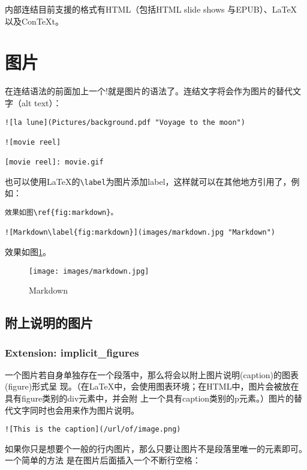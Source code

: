 \documentclass[fancyhdr,bookmark]{ctexbook}
\begin{document}
内部连结目前支援的格式有HTML（包括HTML slide shows 与EPUB）、LaTeX
以及ConTeXt。

\section{图片}\label{ux56feux7247}

在连结语法的前面加上一个!就是图片的语法了。连结文字将会作为图片的替代文字（alt
text）：

\begin{lstlisting}
![la lune](Pictures/background.pdf "Voyage to the moon")

![movie reel]

[movie reel]: movie.gif
\end{lstlisting}

也可以使用LaTeX的\lstinline!\label!为图片添加label，这样就可以在其他地方引用了，例如：

\begin{lstlisting}
效果如图\ref{fig:markdown}。

![Markdown\label{fig:markdown}](images/markdown.jpg "Markdown")
\end{lstlisting}

效果如图\ref{fig:markdown}。

\begin{figure}
\centering
\texttt{[image: images/markdown.jpg]}
\caption{Markdown\label{fig:markdown}}
\end{figure}

\subsection{附上说明的图片}\label{ux9644ux4e0aux8bf4ux660eux7684ux56feux7247}

\subsubsection{Extension:
implicit\_figures}\label{extension-implicit_figures}

一个图片若自身单独存在一个段落中，那么将会以附上图片说明(caption)的图表(figure)形式呈
现。（在LaTeX中，会使用图表环境；在HTML中，图片会被放在具有figure类别的div元素中，并会附
上一个具有caption类别的p元素。）图片的替代文字同时也会用来作为图片说明。

\begin{lstlisting}
![This is the caption](/url/of/image.png)
\end{lstlisting}

如果你只是想要个一般的行内图片，那么只要让图片不是段落里唯一的元素即可。一个简单的方法
是在图片后面插入一个不断行空格：
\end{document}
